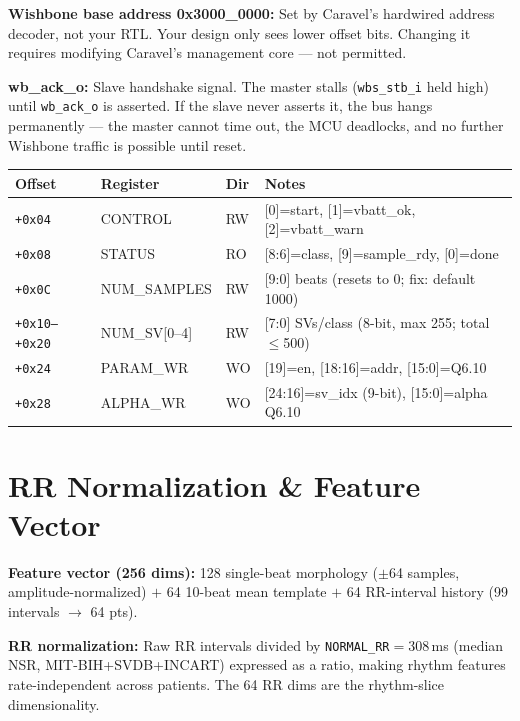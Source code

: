 \documentclass[10pt]{article}
\begin{document}
\textbf{Wishbone base address 0x3000\_0000:} Set by Caravel's hardwired address
decoder, not your RTL. Your design only sees lower offset bits.
Changing it requires modifying Caravel's management core --- not permitted.

\textbf{wb\_ack\_o:} Slave handshake signal. The master stalls (\texttt{wbs\_stb\_i}
held high) until \texttt{wb\_ack\_o} is asserted. If the slave never asserts it,
the bus hangs permanently --- the master cannot time out, the MCU deadlocks,
and no further Wishbone traffic is possible until reset.

\begin{center}
\small
\begin{tabular}{llll}
\toprule
Offset & Register & Dir & Notes \\
\midrule
\texttt{+0x04} & CONTROL & RW & [0]=start, [1]=vbatt\_ok, [2]=vbatt\_warn \\
\texttt{+0x08} & STATUS & RO & [8:6]=class, [9]=sample\_rdy, [0]=done \\
\texttt{+0x0C} & NUM\_SAMPLES & RW & [9:0] beats (resets to 0; fix: default 1000) \\
\texttt{+0x10--+0x20} & NUM\_SV[0--4] & RW & [7:0] SVs/class (8-bit, max 255; total $\leq$500) \\
\texttt{+0x24} & PARAM\_WR & WO & [19]=en, [18:16]=addr, [15:0]=Q6.10 \\
\texttt{+0x28} & ALPHA\_WR & WO & [24:16]=sv\_idx (9-bit), [15:0]=alpha Q6.10 \\
\bottomrule
\end{tabular}
\end{center}

\section{RR Normalization \& Feature Vector}

\textbf{Feature vector (256 dims):}
128 single-beat morphology ($\pm$64 samples, amplitude-normalized) $+$
64 10-beat mean template $+$
64 RR-interval history (99 intervals $\to$ 64 pts).

\textbf{RR normalization:} Raw RR intervals divided by \texttt{NORMAL\_RR}$=$308\,ms
(median NSR, MIT-BIH+SVDB+INCART) expressed as a ratio, making rhythm features
rate-independent across patients. The 64 RR dims are the rhythm-slice dimensionality.

\end{document}
